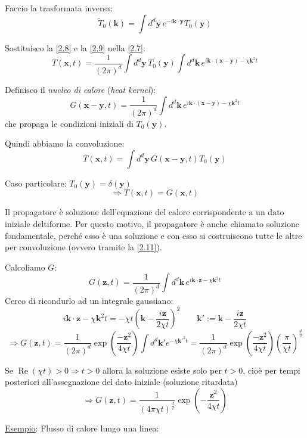 \documentclass[a4paper,11pt]{report}
\newcommand{\x}{\boldsymbol{x}}
\newcommand{\y}{\boldsymbol{y}}
\newcommand{\kk}{\boldsymbol{k}}
\newcommand{\z}{\boldsymbol{z}}
\begin{document}
Faccio la trasformata inversa:
\begin{equation}
\tilde{T}_0(\kk)=\int d^d \y\, e^{-i\kk\cdot\y} T_0(\y) 
\label{2.9}
\end{equation}

Sostituisco la \eqref{2.8} e la \eqref{2.9} nella \eqref{2.7}:
\[
T(\x,t)=\frac{1}{(2\pi)^d}\int d^d \y\, T_0(\y)\int d^d\kk\, e^{i\kk\cdot(\x-\y)-\chi\kk^2 t}
\]

Definisco il \emph{nucleo di calore} (\emph{heat kernel}):
\begin{equation}
G(\x-\y,t) = \frac{1}{(2\pi)^d} \int d^d \kk \, e^{i\kk\cdot(\x-\y)-\chi\kk^2 t}
\end{equation}
che propaga le condizioni iniziali di $T_0(\y)$.

Quindi abbiamo la convoluzione:
\begin{equation}
T(\x,t)=\int d^d \y\, G(\x-\y,t)T_0(\y)
\label{2.11}
\end{equation}

Caso particolare: $T_0(\y)=\delta(\y)$
\[
\Rightarrow T(\x,t)=G(\x,t)
\]

Il propagatore \`e soluzione dell'equazione del calore corrispondente a un dato iniziale deltiforme. Per questo motivo, il propagatore \`e anche chiamato soluzione fondamentale, perch\'e esso \`e una soluzione e con esso si costruiscono tutte le altre per convoluzione (ovvero tramite la \eqref{2.11}).

\medskip

Calcoliamo $G$:
\[
G(\z,t)=\frac{1}{(2\pi)^d}\int d^d \kk\, e^{i\kk\cdot \z-\chi \kk^2 t}
\]
Cerco di ricondurlo ad un integrale gaussiano:
\[
i\kk\cdot \z-\chi \kk^2 t =-\chi t \left(\kk-\frac{i \z}{2 \chi t} \right)^2 \qquad  \kk':=\kk-\frac{i\z}{2\chi t}
\]
\[
\Rightarrow G(\z,t)=\frac{1}{(2\pi)^d}\exp\left(\frac{-\z^2}{4\chi t}\right)\int d^d \kk' e^{-\chi\kk'^2 t}=\frac{1}{(2\pi)^d}\exp\left(\frac{-\z^2}{4\chi t}\right)\left(\frac{\pi}{\chi t}\right)^\frac{d}{2}
\]

Se $\operatorname{Re}(\chi t)>0\Rightarrow t>0$ allora la soluzione esiste solo per $t>0$, cio\`e per tempi posteriori all'assegnazione del dato iniziale (soluzione ritardata)
\begin{equation}
\Rightarrow G(\z,t)=\frac{1}{(4\pi\chi t)^{\frac{d}{2}}}\exp\left(-\frac{\z^2}{4\chi t}\right)
\label{2.12}
\end{equation}

\medskip

\underline{Esempio}: Flusso di calore lungo una linea:
\end{document}
